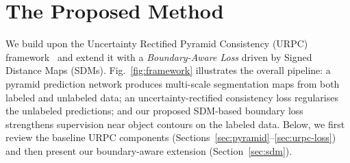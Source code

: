 
\section{The Proposed Method}

We build upon the Uncertainty Rectified Pyramid Consistency (URPC) framework~\cite{media2022urpc} and extend it with a \emph{Boundary-Aware Loss} driven by Signed Distance Maps (SDMs). Fig.~\ref{fig:framework} illustrates the overall pipeline: a pyramid prediction network produces multi-scale segmentation maps from both labeled and unlabeled data; an uncertainty-rectified consistency loss regularises the unlabeled predictions; and our proposed SDM-based boundary loss strengthens supervision near object contours on the labeled data. Below, we first review the baseline URPC components (Sections~\ref{sec:pyramid}--\ref{sec:urpc-loss}) and then present our boundary-aware extension (Section~\ref{sec:sdm}).

